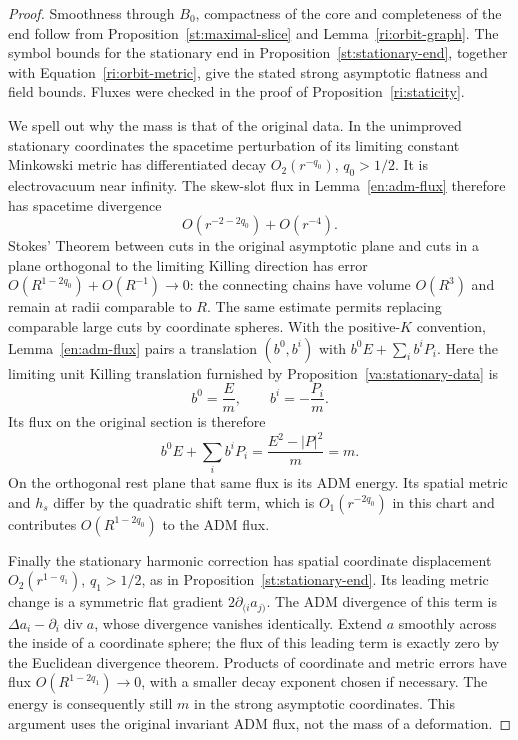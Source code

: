 \begin{proof}
Smoothness through $B_0$, compactness of the core and completeness
of the end follow from Proposition~\ref{st:maximal-slice} and
Lemma~\ref{ri:orbit-graph}.  The symbol bounds for the stationary
end in Proposition~\ref{st:stationary-end}, together with
Equation~\eqref{ri:orbit-metric}, give the stated strong
asymptotic flatness and field bounds.  Fluxes were checked in the
proof of Proposition~\ref{ri:staticity}.

We spell out why the mass is that of the original data.  In the
unimproved stationary coordinates the spacetime perturbation of
its limiting constant Minkowski metric has differentiated decay
$O_2(r^{-q_0})$, $q_0>1/2$.  It is electrovacuum near infinity.
The skew-slot flux in Lemma~\ref{en:adm-flux} therefore has
spacetime divergence
\[
 O(r^{-2-2q_0})+O(r^{-4}).
\]
Stokes' Theorem between cuts in the original asymptotic plane and
cuts in a plane orthogonal to the limiting Killing direction has
error
$O(R^{1-2q_0})+O(R^{-1})\to0$: the connecting chains have volume
$O(R^3)$ and remain at radii comparable to $R$.  The same estimate
permits replacing comparable large cuts by coordinate spheres.
With the positive-$K$ convention, Lemma~\ref{en:adm-flux} pairs
a translation $(b^0,b^i)$ with $b^0E+\sum_i b^iP_i$.  Here the
limiting unit Killing translation furnished by
Proposition~\ref{va:stationary-data} is
\[
 b^0=\frac E m,\qquad b^i=-\frac{P_i}{m}.
\]
Its flux on the original section is therefore
\[
 b^0E+\sum_i b^iP_i
       =\frac{E^2-|P|^2}{m}=m.
\]
On the orthogonal rest plane that same flux is its ADM energy.
Its spatial metric and $h_s$ differ by the quadratic shift term,
which is $O_1(r^{-2q_0})$ in this chart and contributes
$O(R^{1-2q_0})$ to the ADM flux.

Finally the stationary harmonic correction has spatial
coordinate displacement $O_2(r^{1-q_1})$, $q_1>1/2$, as in
Proposition~\ref{st:stationary-end}.  Its leading metric change
is a symmetric flat gradient $2\partial_{(i}a_{j)}$.
The ADM divergence of this term is
$\Delta a_i-\partial_i\operatorname{div}a$, whose divergence
vanishes identically.  Extend $a$ smoothly across the inside of a
coordinate sphere; the flux of this leading term is exactly zero
by the Euclidean divergence theorem.  Products of coordinate and
metric errors have flux $O(R^{1-2q_1})\to0$, with a smaller decay
exponent chosen if necessary.  The energy is consequently still
$m$ in the strong asymptotic coordinates.  This argument uses the
original invariant ADM flux, not the mass of a deformation.
\end{proof}

